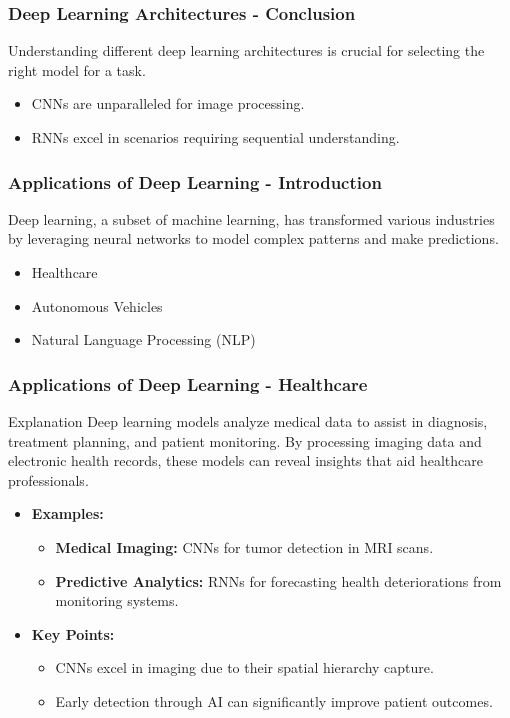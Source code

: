 \documentclass[aspectratio=169]{beamer}
\begin{document}
\begin{frame}[fragile]
    \frametitle{Deep Learning Architectures - Conclusion}
    Understanding different deep learning architectures is crucial for selecting the right model for a task. 
    \begin{itemize}
        \item CNNs are unparalleled for image processing.
        \item RNNs excel in scenarios requiring sequential understanding.
    \end{itemize}
\end{frame}

\begin{frame}[fragile]
    \frametitle{Applications of Deep Learning - Introduction}
    Deep learning, a subset of machine learning, has transformed various industries by leveraging neural networks to model complex patterns and make predictions. 
    \begin{itemize}
        \item Healthcare
        \item Autonomous Vehicles
        \item Natural Language Processing (NLP)
    \end{itemize}
\end{frame}

\begin{frame}[fragile]
    \frametitle{Applications of Deep Learning - Healthcare}
    \begin{block}{Explanation}
        Deep learning models analyze medical data to assist in diagnosis, treatment planning, and patient monitoring. By processing imaging data and electronic health records, these models can reveal insights that aid healthcare professionals.
    \end{block}
    
    \begin{itemize}
        \item \textbf{Examples:}
        \begin{itemize}
            \item \textbf{Medical Imaging:} CNNs for tumor detection in MRI scans.
            \item \textbf{Predictive Analytics:} RNNs for forecasting health deteriorations from monitoring systems.
        \end{itemize}
        
        \item \textbf{Key Points:}
        \begin{itemize}
            \item CNNs excel in imaging due to their spatial hierarchy capture.
            \item Early detection through AI can significantly improve patient outcomes.
        \end{itemize}
    \end{itemize}
\end{frame}
\end{document}
